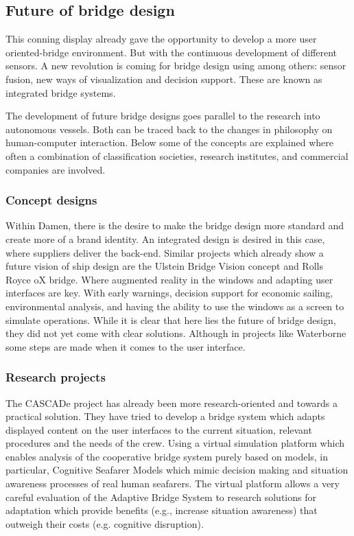 \subsection{Future of bridge design}
This conning display already gave the opportunity to develop a more user oriented-bridge environment. But with the continuous development of different sensors. A new revolution is coming for bridge design using among others: sensor fusion, new ways of visualization and decision support. These are known as integrated bridge systems.

The development of future bridge designs goes parallel to the research into autonomous vessels. Both can be traced back to the changes in philosophy on human-computer interaction. Below some of the concepts are explained where often a combination of classification societies, research institutes, and commercial companies are involved.

\subsubsection{Concept designs}
Within Damen, there is the desire to make the bridge design more standard and create more of a brand identity. An integrated design is desired in this case, where suppliers deliver the back-end. Similar projects which already show a future vision of ship design are the Ulstein Bridge Vision concept and Rolls Royce oX bridge. Where augmented reality in the windows and adapting user interfaces are key. With early warnings, decision support for economic sailing, environmental analysis, and having the ability to use the windows as a screen to simulate operations. While it is clear that here lies the future of bridge design, they did not yet come with clear solutions. Although in projects like Waterborne some steps are made when it comes to the user interface.\cite{RollsRoyce2015} \cite{Ulstein2013}

\subsubsection{Research projects}
The CASCADe project has already been more research-oriented and towards a practical solution. They have tried to develop a bridge system which adapts displayed content on the user interfaces to the current situation, relevant procedures and the needs of the crew. Using a virtual simulation platform which enables analysis of the cooperative bridge system purely based on models, in particular, Cognitive Seafarer Models which mimic decision making and situation awareness processes of real human seafarers. The virtual platform allows a very careful evaluation of the Adaptive Bridge System to research solutions for adaptation which provide benefits (e.g., increase situation awareness) that outweigh their costs (e.g. cognitive disruption).\cite{CASCADe2015}

